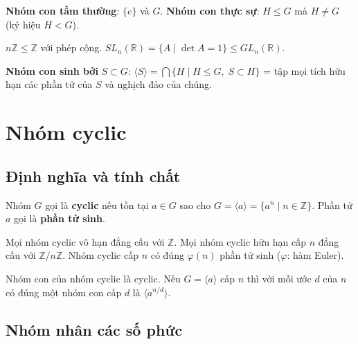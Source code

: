 \documentclass[12pt,a4paper]{article}
\begin{document}
\begin{dinhnghia}
  \textbf{Nhóm con tầm thường}: $\{e\}$ và $G$. \textbf{Nhóm con thực sự}: $H \le G$ mà $H \ne G$ (ký hiệu $H < G$).
\end{dinhnghia}

\begin{vidu}
  $n\mathbb{Z} \le \mathbb{Z}$ với phép cộng. $SL_n(\mathbb{R}) = \{A \mid \det A = 1\} \le GL_n(\mathbb{R})$.
\end{vidu}

\begin{dinhnghia}
  \textbf{Nhóm con sinh bởi} $S \subset G$: $\langle S \rangle = \bigcap \{H \mid H \le G,\; S \subset H\}$ = tập mọi tích hữu hạn các phần tử của $S$ và nghịch đảo của chúng.
\end{dinhnghia}

\section{Nhóm cyclic}

\subsection{Định nghĩa và tính chất}

\begin{dinhnghia}
  Nhóm $G$ gọi là \textbf{cyclic} nếu tồn tại $a \in G$ sao cho $G = \langle a \rangle = \{a^n \mid n \in \mathbb{Z}\}$. Phần tử $a$ gọi là \textbf{phần tử sinh}.
\end{dinhnghia}

\begin{dinhly}
  Mọi nhóm cyclic vô hạn đẳng cấu với $\mathbb{Z}$. Mọi nhóm cyclic hữu hạn cấp $n$ đẳng cấu với $\mathbb{Z}/n\mathbb{Z}$. Nhóm cyclic cấp $n$ có đúng $\varphi(n)$ phần tử sinh ($\varphi$: hàm Euler).
\end{dinhly}

\begin{dinhly}
  Nhóm con của nhóm cyclic là cyclic. Nếu $G = \langle a \rangle$ cấp $n$ thì với mỗi ước $d$ của $n$ có đúng một nhóm con cấp $d$ là $\langle a^{n/d} \rangle$.
\end{dinhly}

\subsection{Nhóm nhân các số phức}
\end{document}
